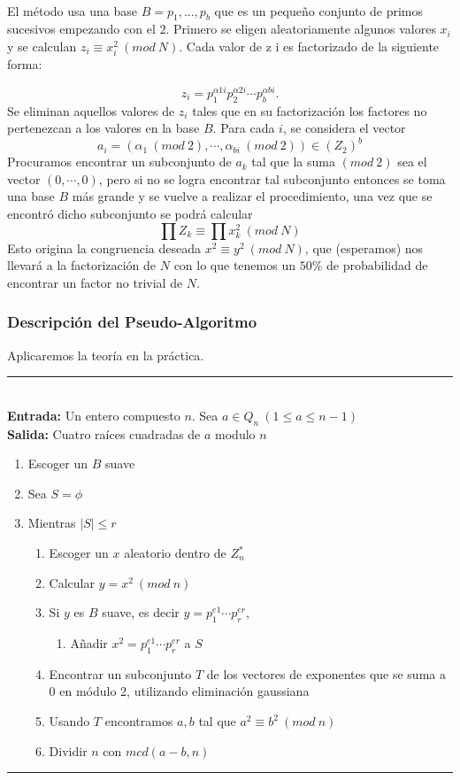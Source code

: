\documentclass[11pt, conference]{IEEEtran}
\begin{document}
\

El método usa una base $B = {p_1 , ..., p_b }$ que es un pequeño conjunto de primos sucesivos empezando con el $2$. Primero se eligen aleatoriamente algunos valores $x_i$ y se calculan $z_i\equiv x^2_i\ (mod\ N)$. Cada valor de z i es factorizado de la siguiente forma:

\[
z_i = p^{\alpha 1i}_1 p^{\alpha 2i}_2\cdots p^{\alpha bi}_b .
\]
Se eliminan aquellos valores de $z_i$ tales que en su factorización los factores no pertenezcan a los valores en la base $B$. Para cada $i$, se considera el vector
\[
a_i =(\alpha_1\ (mod\ 2),\cdots,\alpha_{bi}\ (mod\ 2) )\in (Z_2)^b
\]
Procuramos encontrar un subconjunto de $a_k$ tal que la suma $(mod\ 2)$ sea el vector $(0,\cdots, 0)$, pero si no se logra encontrar tal subconjunto entonces se toma una base $B$ más grande y se vuelve a realizar el procedimiento, una vez que se encontró dicho subconjunto se podrá calcular
\[
\prod Z_k\equiv\prod x_k^2 \ (mod\ N)
\]
Esto origina la congruencia deseada $x^2\equiv y^2\ (mod\ N)$, que (esperamos) nos llevará a la factorización de $N$ con lo que tenemos un $50\%$ de probabilidad de encontrar un factor no trivial de $N$.

\subsubsection[Descripción del Pseudo-Algoritmo]{\textbf{Descripción del Pseudo-Algoritmo}}
Aplicaremos la teoría en la práctica.\\ 
\rule[0mm]{181mm}{0.1mm}\\
\textbf{Entrada:} Un entero compuesto $n$. Sea $a\in Q_n\ (1\leq a\leq n-1)$\\
\textbf{Salida:} Cuatro raíces cuadradas de $a$ modulo $n$
\begin{enumerate}
	\item Escoger un $B$ suave
	\item Sea $S = \phi$
	\item Mientras $|S|\leq r$
	\begin{enumerate}
		\item Escoger un $x$ aleatorio dentro de $Z_n^*$
		\item Calcular $y = x^2\ (mod\ n)$
		\item Si $y$ es $B$ suave, es decir $y = p_1^{e1}\cdots p_r^{er}$, 
		\begin{enumerate}
			\item Añadir $x^2 = p_1^{e1}\cdots p_r^{er}$ a $S$
		\end{enumerate}
		\item Encontrar un subconjunto $T$ de los vectores de exponentes que se suma a 0 en módulo 2, utilizando
		eliminación gaussiana
		\item Usando $T$ encontramos $a,b$ tal que $a^2\equiv b^2\ (mod\ n)$
		\item Dividir $n$ con $mcd(a-b,n)$
	\end{enumerate}
\end{enumerate}
\rule[3mm]{181mm}{0.1mm}
\end{document}
